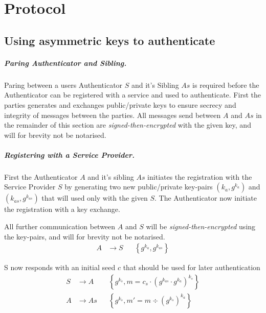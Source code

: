 \chapter{Protocol}\label{ch:protocol}



\section{Using asymmetric keys to authenticate}

\paragraph{Paring Authenticator and Sibling.} Paring between a users Authenticator $S$ and it's Sibling $As$ is required before the Authenticator can be registered with a service and used to authenticate. First the parties generates and exchanges public/private keys to ensure secrecy and integrity of messages between the parties. All messages send between $A$ and $As$ in the remainder of this section are \textit{signed-then-encrypted} with the given key, and will for brevity not be notarised.

\paragraph{Registering with a Service Provider.}
First the Authenticator $A$ and it's sibling $As$ initiates the registration with the Service Provider $S$ by generating two new public/private key-pairs $\left(k_a,g^{k_a}\right)$ and $\left(k_{as},g^{k_{as}}\right)$ that will used only with the given $S$. The Authenticator now initiate the registration with a key exchange.

All further communication between $A$ and $S$ will be \textit{signed-then-encryp\-ted} using the key-pairs, and will for brevity not be notarised. %
\begin{align}
A   &\rightarrow S      &&  \left\{g^{k_a},g^{k_{as}}\right\}
\end{align}

S now responds with an initial seed $c$ that should be used for later authentication
\begin{align}
S   &\rightarrow A      &&  \left\{g^{k_s}, m = c_s \cdot  \left( g^{k_{as}} \cdot g^{k_a} \right)^{k_s}\right\}\\
A   &\rightarrow As     &&  \left\{g^{k_s}, m' = m \div {\left(g^{k_s}\right)^{k_a}}\right\}
\end{align}

